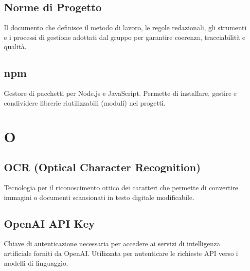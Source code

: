 \documentclass[a4paper, 11pt, oneside]{scrartcl} %
\begin{document}
\subsection*{Norme di Progetto}


Il documento che definisce il metodo di lavoro, le regole redazionali, gli strumenti e i processi di gestione adottati dal gruppo per garantire coerenza, tracciabilità e qualità.

\vspace{0.5cm}

\subsection*{npm}


Gestore di pacchetti per Node.js e JavaScript. Permette di installare, gestire e condividere librerie riutilizzabili (moduli) nei progetti.

\vspace{0.5cm}



\section*{O}


\subsection*{OCR (Optical Character Recognition)}
Tecnologia per il riconoscimento ottico dei caratteri che permette di convertire immagini o documenti scansionati in testo digitale modificabile.
\vspace{0.5cm}

\subsection*{OpenAI API Key}


Chiave di autenticazione necessaria per accedere ai servizi di intelligenza artificiale forniti da OpenAI. Utilizzata per autenticare le richieste API verso i modelli di linguaggio.
\end{document}
